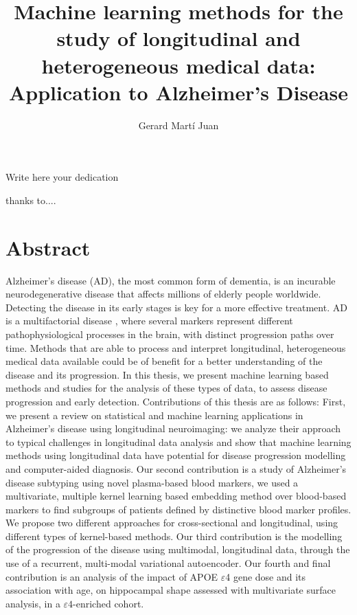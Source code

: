 \documentclass[12pt, b5paper,twoside]{tesi_upf}
\title{Machine learning methods for the study of longitudinal and heterogeneous medical data: Application to Alzheimer's Disease}
\subtitle{}
\author{Gerard Martí Juan}
\begin{document}
\frontmatter
\maketitle

\cleardoublepage


\noindent Write here your dedication

\cleardoublepage


 thanks to....

\cleardoublepage


\section*{\Large \sffamily Abstract}
Alzheimer's disease (AD), the most common form of dementia, is an incurable neurodegenerative disease that affects millions of elderly people worldwide. Detecting the disease in its early stages is key for a more effective treatment. AD is a multifactorial disease , where several markers represent different pathophysiological processes in the brain, with distinct progression paths over time. Methods that are able to process and interpret longitudinal, heterogeneous medical data available could be of benefit for a better understanding of the disease and its progression. In this thesis, we present machine learning based methods and studies for the analysis of these types of data, to assess disease progression and early detection.
Contributions of this thesis are as follows: First, we present a review on statistical and machine learning applications in Alzheimer's disease using longitudinal neuroimaging: we analyze their approach to typical challenges in longitudinal data analysis and show that machine learning methods using longitudinal data have potential for disease progression modelling and computer-aided diagnosis. Our second contribution is a study of Alzheimer's disease subtyping using novel plasma-based blood markers, we used a multivariate, multiple kernel learning based embedding method over blood-based markers to find subgroups of patients defined by distinctive blood marker profiles. We propose two different approaches for cross-sectional and longitudinal, using different types of kernel-based methods. Our third contribution is the modelling of the progression of the disease using multimodal, longitudinal data, through the use of a recurrent, multi-modal variational autoencoder. Our fourth and final contribution is an analysis of the impact of APOE $\varepsilon$4 gene dose and its association with age, on hippocampal shape assessed with multivariate surface analysis, in a $\varepsilon4$-enriched cohort.
\end{document}
